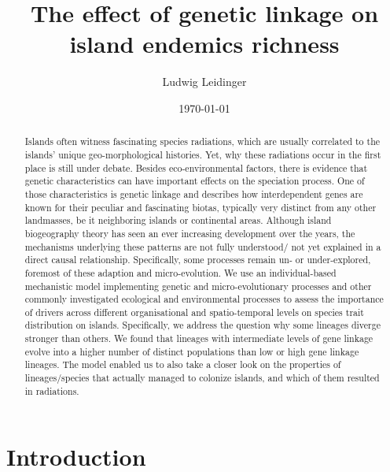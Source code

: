 \documentclass[a4paper]{scrartcl}
\title{The effect of genetic linkage on island endemics richness}%
\author{Ludwig Leidinger}
\date{\today}
\begin{document}
\maketitle

\begin{abstract}
  Islands often witness fascinating species radiations, which are usually correlated to the islands' unique
  geo-morphological histories.
  Yet, why these radiations occur in the first place is still under debate.
  Besides eco-environmental factors, there is evidence that genetic characteristics can have important
  effects on the speciation process.
  One of those characteristics is genetic linkage and describes how interdependent genes are known for their peculiar and fascinating biotas, typically very distinct from any other landmasses, be it neighboring islands or continental areas.
  Although island biogeography theory has seen an ever increasing development over the years,
  the mechanisms underlying these patterns are not fully understood/ not yet explained in a direct causal relationship.
  Specifically, some processes remain un- or under-explored, foremost of these adaption and micro-evolution.
  We use an individual-based mechanistic model implementing genetic and micro-evolutionary processes and other commonly investigated ecological and
  environmental processes to assess the importance of drivers across different organisational and spatio-temporal levels
  on species trait distribution on islands.
  Specifically, we address the question why some lineages diverge stronger than others.
  We found that lineages with intermediate levels of gene linkage evolve into a higher number of distinct populations
  than low or high gene linkage lineages.
  The model enabled us to also take a closer look on the properties of lineages/species that actually managed to colonize islands,
  and which of them resulted in radiations.
\end{abstract}

\section{Introduction}


\end{document}

